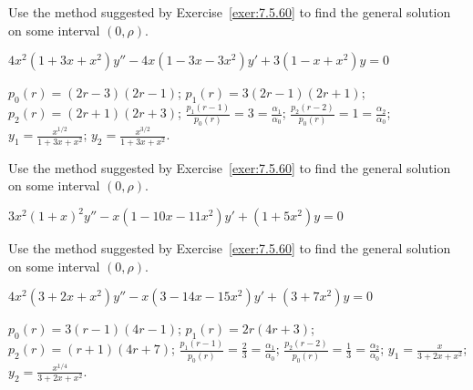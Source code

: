\documentclass{ximera}
\begin{document}
\begin{problem}\label{exer:7.5.66}
Use the method
suggested by Exercise~\ref{exer:7.5.60} to find the general solution on
some interval $(0,\rho)$. 

$4x^2(1+3x+x^2)y''-4x(1-3x-3x^2)y'+3(1-x+x^2)y=0$

\begin{solution}
$p_0(r)=(2r-3)(2r-1)$;
$p_1(r)=3(2r-1)(2r+1)$;
$p_2(r)=(2r+1)(2r+3)$;
$\frac{p_1(r-1)}{ p_0(r)}=3=\frac{\alpha_1}{\alpha_0}$;
$\frac{p_2(r-2)}{ p_0(r)}=1=\frac{\alpha_2}{\alpha_0}$;
$y_1=\frac{x^{1/2}}{1+3x+x^2}$;  $y_2=\frac{x^{3/2}}{1+3x+x^2}$.
\end{solution}
\end{problem}

\begin{problem}\label{exer:7.5.67}
Use the method
suggested by Exercise~\ref{exer:7.5.60} to find the general solution on
some interval $(0,\rho)$.

$3x^2(1+x)^2y''-x(1-10x-11x^2)y'+(1+5x^2)y=0$
\end{problem}

\begin{problem}\label{exer:7.5.68}
Use the method
suggested by Exercise~\ref{exer:7.5.60} to find the general solution on
some interval $(0,\rho)$.

$4x^2(3+2x+x^2)y''-x(3-14x-15x^2)y'+(3+7x^2)y=0$

\begin{solution}
    $p_0(r)=3(r-1)(4r-1)$;
$p_1(r)=2r(4r+3)$;
$p_2(r)=(r+1)(4r+7)$;
$\frac{p_1(r-1)}{ p_0(r)}=\frac{2}{3}=\frac{\alpha_1}{\alpha_0}$;
$\frac{p_2(r-2)}{ p_0(r)}=\frac{1}{3}=\frac{\alpha_2}{\alpha_0}$;
$y_1=\frac{x}{3+2x+x^2}$; $y_2=\frac{x^{1/4}}{3+2x+x^2}$.
\end{solution}
\end{problem}
\end{document}
